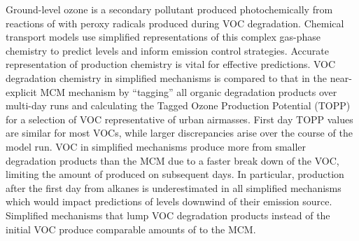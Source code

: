 Ground-level ozone is a secondary pollutant produced photochemically from reactions of  with peroxy radicals produced during VOC degradation. 
Chemical transport models use simplified representations of this complex gas-phase chemistry to predict  levels and inform emission control strategies. 
Accurate representation of  production chemistry is vital for effective predictions.
VOC degradation chemistry in simplified mechanisms is compared to that in the near-explicit MCM mechanism by ``tagging'' all organic degradation products over multi-day runs and calculating the Tagged Ozone Production Potential (TOPP) for a selection of VOC representative of urban airmasses.
First day TOPP values are similar for most VOCs, while larger discrepancies arise over the course of the model run.
VOC in simplified mechanisms produce more  from smaller degradation products than the MCM due to a faster break down of the VOC, limiting the amount of  produced on subsequent days.
In particular,  production after the first day from alkanes is underestimated in all simplified mechanisms which would impact predictions of  levels downwind of their emission source.
Simplified mechanisms that lump VOC degradation products instead of the initial VOC produce comparable amounts of  to the MCM.
